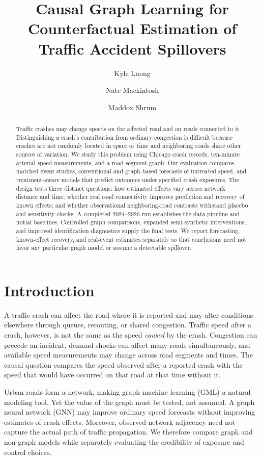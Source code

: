 \documentclass[sigconf,nonacm]{acmart}
\title[Counterfactual Traffic Accident Spillovers]{Causal Graph Learning for Counterfactual Estimation of Traffic Accident Spillovers}
\author{Kyle Luong}
\affiliation{\institution{University of Virginia}\city{Charlottesville}\state{Virginia}\country{USA}}
\author{Nate Mackintosh}
\affiliation{\institution{University of Virginia}\city{Charlottesville}\state{Virginia}\country{USA}}
\author{Maddox Shrum}
\affiliation{\institution{University of Virginia}\city{Charlottesville}\state{Virginia}\country{USA}}
\begin{document}
\begin{abstract}
Traffic crashes may change speeds on the affected road and on roads
connected to it. Distinguishing a crash's contribution from ordinary
congestion is difficult because crashes are not randomly located in
space or time and neighboring roads share other sources of variation.
We study this problem using Chicago crash records, ten-minute arterial
speed measurements, and a road-segment graph. Our evaluation compares
matched event studies, conventional and graph-based forecasts of
untreated speed, and treatment-aware models that predict outcomes under
specified crash exposures. The design tests three distinct questions:
how estimated effects vary across network distance and time; whether
real road connectivity improves prediction and recovery of known
effects; and whether observational neighboring-road contrasts withstand
placebo and sensitivity checks. A completed 2024--2026 run establishes
the data pipeline and initial baselines. Controlled graph comparisons,
expanded semi-synthetic interventions, and improved identification
diagnostics supply the final tests. We report forecasting, known-effect
recovery, and real-event estimates separately so that conclusions need
not favor any particular graph model or assume a detectable spillover.
\end{abstract}
\maketitle

\section{Introduction}
A traffic crash can affect the road where it is reported and may alter
conditions elsewhere through queues, rerouting, or shared congestion.
Traffic speed after a crash, however, is not the same as the speed
\emph{caused} by the crash. Congestion can precede an incident, demand
shocks can affect many roads simultaneously, and available speed
measurements may change across road segments and times. The causal
question compares the speed observed after a reported crash with the
speed that would have occurred on that road at that time without it.

Urban roads form a network, making graph machine learning (GML) a
natural modeling tool. Yet the value of the graph must be tested, not
assumed. A graph neural network (GNN) may improve ordinary speed
forecasts without improving estimates of crash effects. Moreover,
observed network adjacency need not capture the actual path of traffic
propagation. We therefore compare graph and non-graph models while
separately evaluating the credibility of exposure and control choices.
\end{document}
